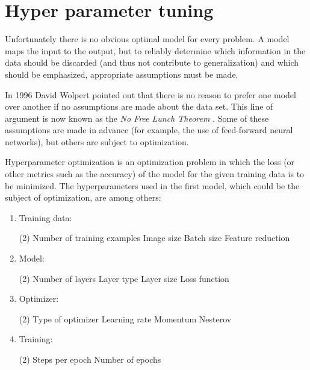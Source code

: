 \section{Hyper parameter tuning} \label{ch:hyper_parameter_tuning}

Unfortunately there is no obvious optimal model for every problem.
A model maps the input to the output, but to reliably determine which information in the data should be discarded (and thus not contribute to generalization) and which should be emphasized, appropriate assumptions must be made.

In 1996 David Wolpert pointed out that there is no reason to prefer one model over another if no assumptions are made about the data set.
This line of argument is now known as the \textit{No Free Lunch Theorem} \cite{Wolpert1996}.
Some of these assumptions are made in advance (for example, the use of feed-forward neural networks), but others are subject to optimization.

Hyperparameter optimization is an optimization problem in which the loss (or other metrics such as the accuracy) of the model for the given training data is to be minimized.
The hyperparameters used in the first model, which could be the subject of optimization, are among others:

\begin{enumerate}
    \item Training data:
    \begin{tasks}(2)
        \task Number of training examples
        \task Image size
        \task Batch size
        \task Feature reduction
    \end{tasks}
    \item Model:
    \begin{tasks}(2)
        \task Number of layers
        \task Layer type
        \task Layer size
        \task Loss function
    \end{tasks}
    \item Optimizer:
    \begin{tasks}(2)
        \task Type of optimizer
        \task Learning rate
        \task Momentum
        \task Nesterov
    \end{tasks}
    \item Training:
    \begin{tasks}(2)
        \task Steps per epoch
        \task Number of epochs
    \end{tasks}
\end{enumerate}

